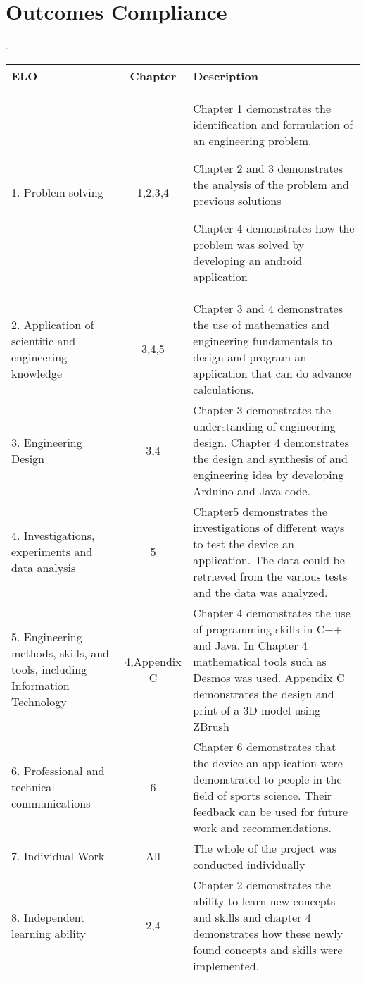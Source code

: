 \chapter{Outcomes Compliance}
\makeatletter{}\makeatother
\label{appen:derivations_bigramseg}

\begin{center}.
  \begin{tabular}{ | m{4cm} |c|m{10cm}| }
    \hline
    \textbf{ELO} & \textbf{Chapter} & \textbf{Description} \\
    \hline
    1. Problem solving & 1,2,3,4 & Chapter 1 demonstrates the identification and formulation of an engineering problem.
    
    Chapter 2 and 3 demonstrates the analysis of the problem and previous solutions
    
    Chapter 4 demonstrates how the problem was solved by developing an android application\\ 
    \hline
    2. Application of scientific and engineering knowledge & 3,4,5 & Chapter 3 and 4 demonstrates the use of mathematics and engineering fundamentals to design and program an application that can do advance calculations.\\ 
    \hline
    3. Engineering Design & 3,4 & Chapter 3 demonstrates the understanding of engineering design. Chapter 4 demonstrates the design and synthesis of and engineering idea by developing Arduino and Java code.   \\ 
    \hline
    4. Investigations, experiments and data analysis & 5 & Chapter5 demonstrates the investigations of different ways to test the device an application. The data could be retrieved from the various tests and the data was analyzed. \\ 
    \hline
    5. Engineering methods, skills, and tools, including Information Technology & 4,Appendix C & Chapter 4 demonstrates the use of programming skills in C++ and Java. In Chapter 4 mathematical tools such as Desmos was used. Appendix C demonstrates the design and print of a 3D model using ZBrush\\ 
    \hline
    6. Professional and technical communications& 6 & Chapter 6 demonstrates that the device an application were demonstrated to people in the field of sports science. Their feedback can be used for future work and recommendations. \\ 
    \hline
    7. Individual Work & All & The whole of the project was conducted individually \\ 
    \hline
    8. Independent learning ability& 2,4 & Chapter 2 demonstrates the ability to learn new concepts and skills and chapter 4 demonstrates how these newly found concepts and skills were implemented.\\
    \hline
  \end{tabular}
  \end{center}

